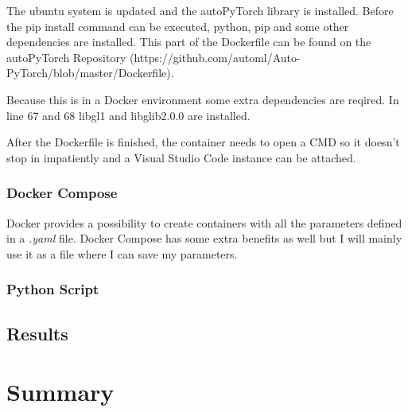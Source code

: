 \documentclass[a4paper, 12pt, oneside]{scrbook}
\begin{document}
		\noindent 
		
		\noindent The ubuntu system is updated and the autoPyTorch library is installed. Before the pip install command can be executed, python, pip and some other dependencies are installed. This part of the Dockerfile can be found on the autoPyTorch Repository (https://github.com/automl/Auto-PyTorch/blob/master/Dockerfile). 
		
		\noindent Because this is in a Docker environment some extra dependencies are reqired. In line 67 and 68 libgl1 and libglib2.0.0 are installed. 
		
		\noindent 
		
		\noindent After the Dockerfile is finished, the container needs to open a CMD so it doesn't stop in impatiently and a Visual Studio Code instance can be attached.
		
		\noindent 
		
		\subsection{Docker Compose}
		
		
		Docker provides a possibility to create containers with all the parameters defined in a \textit{.yaml} file. Docker Compose has some extra benefits as well but I will mainly use it as a file where I can save my parameters. 
		
		\noindent 
		
		
		\subsection{Python Script}
	
	
		\section{Results}
		
		
	\chapter{Summary} %
	
	\frontmatter
	\printbibliography
\end{document}
